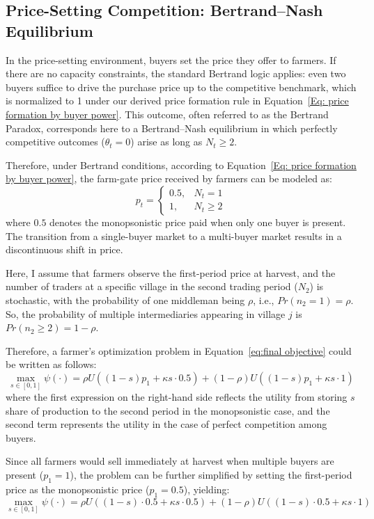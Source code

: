 \subsection{Price-Setting Competition: Bertrand--Nash Equilibrium}
\noindent In the price-setting environment, buyers set the price they offer to farmers. If there are no capacity constraints, the standard Bertrand logic applies: even two buyers suffice to drive the purchase price up to the competitive benchmark, which is normalized to 1 under our derived price formation rule in Equation~\ref{Eq: price formation by buyer power}. This outcome, often referred to as the Bertrand Paradox, corresponds here to a Bertrand--Nash equilibrium in which perfectly competitive outcomes ($\theta_t=0$) arise as long as $N_t \geq 2$.

Therefore, under Bertrand conditions, according to Equation~\ref{Eq: price formation by buyer power}, the farm-gate price received by farmers can be modeled as:
\begin{equation}
p_t = 
\begin{cases}
0.5, & N_t = 1 \\
1, & N_t \geq 2
\end{cases}
\label{Eq: Bertrand Price Schedule}
\end{equation}
\noindent where $0.5$ denotes the monopsonistic price paid when only one buyer is present. The transition from a single-buyer market to a multi-buyer market results in a discontinuous shift in price.

Here, I assume that farmers observe the first-period price at harvest, and the number of traders at a specific village in the second trading period ($N_2$) is stochastic, with the probability of one middleman being $\rho$, i.e., $Pr(n_2=1)=\rho$. So, the probability of multiple intermediaries appearing in village $j$ is $Pr(n_2 \geq 2) = 1-\rho$.

Therefore, a farmer's optimization problem in Equation~\ref{eq:final objective} could be written as follows:
\begin{equation}
\max_{s \in [0,1]} \psi(\cdot) = \rho U((1-s)p_1 + \kappa s \cdot 0.5) + (1-\rho) U \left( (1-s)p_1 +  \kappa s \cdot 1 \right)
\end{equation}
where the first expression on the right-hand side reflects the utility from storing $s$ share of production to the second period in the monopsonistic case, and the second term represents the utility in the case of perfect competition among buyers. 

Since all farmers would sell immediately at harvest when multiple buyers are present ($p_1 = 1$), the problem can be further simplified by setting the first-period price as the monopsonistic price ($p_1 = 0.5$), yielding:
\begin{equation}
\label{eq:Bertrand objective}
\max_{s \in [0,1]} \psi(\cdot) = \rho U((1-s)\cdot0.5 + \kappa s \cdot 0.5) + (1-\rho) U \left( (1-s)\cdot0.5 +  \kappa s \cdot 1 \right)
\end{equation}

